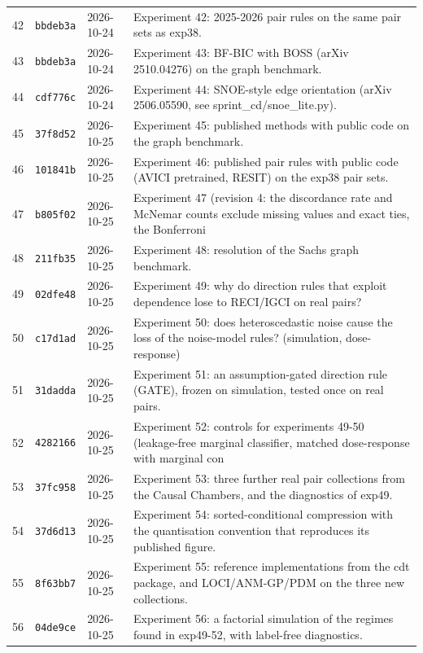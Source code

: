 \begin{longtable}{@{}rllp{9.8cm}@{}}
42 & \texttt{bbdeb3a} & 2026-10-24 & Experiment 42: 2025-2026 pair rules on the same pair sets as exp38.\\
43 & \texttt{bbdeb3a} & 2026-10-24 & Experiment 43: BF-BIC with BOSS (arXiv 2510.04276) on the graph benchmark.\\
44 & \texttt{cdf776c} & 2026-10-24 & Experiment 44: SNOE-style edge orientation (arXiv 2506.05590, see sprint\_cd/snoe\_lite.py).\\
45 & \texttt{37f8d52} & 2026-10-25 & Experiment 45: published methods with public code on the graph benchmark.\\
46 & \texttt{101841b} & 2026-10-25 & Experiment 46: published pair rules with public code (AVICI pretrained, RESIT) on the exp38 pair sets.\\
47 & \texttt{b805f02} & 2026-10-25 & Experiment 47 (revision 4: the discordance rate and McNemar counts exclude missing values and exact ties, the Bonferroni\\
48 & \texttt{211fb35} & 2026-10-25 & Experiment 48: resolution of the Sachs graph benchmark.\\
49 & \texttt{02dfe48} & 2026-10-25 & Experiment 49: why do direction rules that exploit dependence lose to RECI/IGCI on real pairs?\\
50 & \texttt{c17d1ad} & 2026-10-25 & Experiment 50: does heteroscedastic noise cause the loss of the noise-model rules? (simulation, dose-response)\\
51 & \texttt{31dadda} & 2026-10-25 & Experiment 51: an assumption-gated direction rule (GATE), frozen on simulation, tested once on real pairs.\\
52 & \texttt{4282166} & 2026-10-25 & Experiment 52: controls for experiments 49-50 (leakage-free marginal classifier, matched dose-response with marginal con\\
53 & \texttt{37fc958} & 2026-10-25 & Experiment 53: three further real pair collections from the Causal Chambers, and the diagnostics of exp49.\\
54 & \texttt{37d6d13} & 2026-10-25 & Experiment 54: sorted-conditional compression with the quantisation convention that reproduces its published figure.\\
55 & \texttt{8f63bb7} & 2026-10-25 & Experiment 55: reference implementations from the cdt package, and LOCI/ANM-GP/PDM on the three new collections.\\
56 & \texttt{04de9ce} & 2026-10-25 & Experiment 56: a factorial simulation of the regimes found in exp49-52, with label-free diagnostics.\\

\end{longtable}
